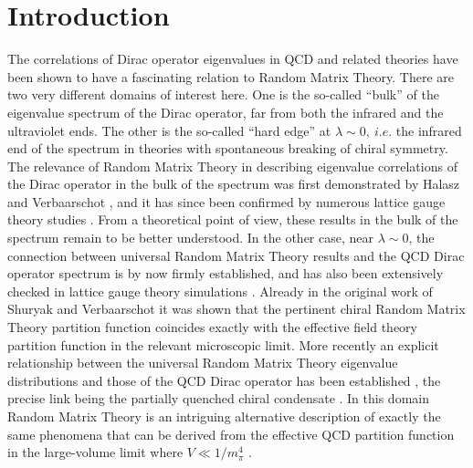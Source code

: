 \documentclass[11pt]{article}
\begin{document}
\setcounter{page}{1}

\section {Introduction}

The correlations of Dirac operator eigenvalues in QCD and related 
theories have been shown to have a fascinating relation to Random Matrix
Theory. There are two very different domains of interest here. One is
the so-called ``bulk'' of the eigenvalue spectrum of the Dirac operator,
far from both the infrared and the ultraviolet ends. The other is the
so-called ``hard edge'' at $\lambda \sim 0, ~i.e.$ the infrared end of the 
spectrum in theories with spontaneous breaking of chiral symmetry. The
relevance of Random Matrix Theory in describing eigenvalue correlations
of the Dirac operator in the bulk of the spectrum was first demonstrated
by Halasz and Verbaarschot \cite{HV}, and it has since been confirmed
by numerous lattice gauge theory studies \cite{bulk}. {}From a theoretical
point of view, these results in the bulk of the spectrum remain to be
better understood. In the other case, near $\lambda \sim 0$, the connection
between universal Random Matrix Theory results and the QCD Dirac operator 
spectrum \cite{SV,V,ADMN} is by now firmly established, and has also been
extensively checked in lattice gauge theory simulations \cite{latedge}. 
Already in the original work
of Shuryak and Verbaarschot \cite{SV} it was shown that the pertinent
chiral Random Matrix
Theory partition function coincides exactly with the effective field theory
partition function in the relevant microscopic
limit. More recently an explicit relationship between the 
universal Random Matrix Theory eigenvalue distributions
and those of the QCD Dirac operator has been established \cite{AD,OTV},
the precise link being the partially quenched chiral condensate
\cite{OTV,DS}. In this domain Random Matrix Theory is an intriguing alternative
description of exactly the same phenomena that can be derived from the
effective QCD partition function in the large-volume limit where $V \ll 
1/m_{\pi}^4$ \cite{LS}.
\end{document}
